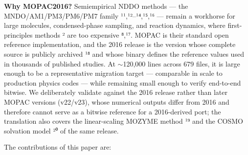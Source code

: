 \documentclass[preprint,12pt]{elsarticle}
\begin{document}
\textbf{Why MOPAC2016?} Semiempirical NDDO methods --- the MNDO/AM1/PM3/PM6/PM7 family ¹¹,¹²--¹⁴,¹⁵,¹⁶ --- remain a workhorse for large molecules, condensed-phase sampling, and reaction dynamics, where first-principles methods ² are too expensive ⁸,¹⁷. MOPAC is their standard open reference implementation, and the 2016 release is the version whose complete source is publicly archived ¹⁸ and whose binary defines the reference values used in thousands of published studies. At $\sim$120,000 lines across 679 files, it is large enough to be a representative migration target --- comparable in scale to production physics codes --- while remaining small enough to verify end-to-end bitwise. We deliberately validate against the 2016 release rather than later MOPAC versions (v22/v23), whose numerical outputs differ from 2016 and therefore cannot serve as a bitwise reference for a 2016-derived port; the translation also covers the linear-scaling MOZYME method ¹⁹ and the COSMO solvation model ²⁰ of the same release.

The contributions of this paper are:
\end{document}
